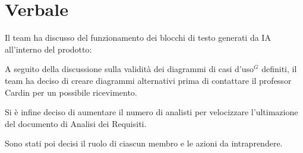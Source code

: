 \documentclass[a4paper,10pt]{article}
\begin{document}
\section*{Verbale}

Il team ha discusso del funzionamento dei blocchi di testo generati da IA all'interno del prodotto:
\vspace{1\baselineskip}

A seguito della discussione sulla validità dei diagrammi di casi d'uso$^G$ definiti, il team ha deciso di creare diagrammi alternativi prima di contattare il professor Cardin per un possibile ricevimento.

Si è infine deciso di aumentare il numero di analisti per velocizzare l'ultimazione del documento di Analisi dei Requisiti.
\vspace{1\baselineskip}

Sono stati poi decisi il ruolo di ciascun membro e le azioni da intraprendere.
\end{document}
